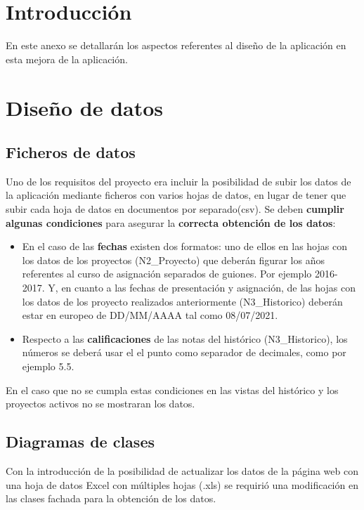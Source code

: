 
\section{Introducción}
En este anexo se detallarán los aspectos referentes al diseño de la aplicación en esta mejora de la aplicación.

\section{Diseño de datos}

\subsection{Ficheros de datos}

Uno de los requisitos del proyecto era incluir la posibilidad de subir los datos de la aplicación mediante ficheros con varios hojas de datos, en lugar de tener que subir cada hoja de datos en documentos por separado(csv). Se deben \textbf{cumplir algunas condiciones} para asegurar la \textbf{correcta obtención de los datos}:
\begin{itemize}
	\tightlist
	\item En el caso de las \textbf{fechas} existen dos formatos: uno de ellos en las hojas con los datos de los proyectos (N2\_Proyecto) que deberán figurar los años referentes al curso de asignación separados de guiones. Por ejemplo 2016-2017. 
	Y, en cuanto a las fechas de presentación y asignación, de las hojas con los datos de los proyecto realizados anteriormente (N3\_Historico) deberán estar en europeo de DD/MM/AAAA tal como 08/07/2021.
	
	\item Respecto a las \textbf{calificaciones} de las notas del histórico (N3\_Historico), los números se deberá usar el el punto como separador de decimales, como por ejemplo 5.5.
\end{itemize}

En el caso que no se cumpla estas condiciones en las vistas del histórico y los proyectos activos no se mostraran los datos.

\subsection{Diagramas de clases}	

Con la introducción de la posibilidad de actualizar los datos de la página web con una hoja de datos Excel con múltiples hojas (.xls) se requirió una modificación en las clases fachada para la obtención de los datos. 

